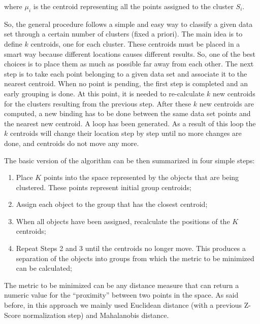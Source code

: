 \documentclass[12pt,a4paper,cucitura]{toptesi}
\begin{document}
where $\mu_i$ is the centroid representing all the points assigned to the cluster $S_i$.

So, the general procedure follows a simple and easy way to classify a given data set through a certain number of clusters (fixed a priori).
The main idea is to define $k$ centroids, one for each cluster.
These centroids must be placed in a smart way because different locations causes different results.
So, one of the best choices is to place them as much as possible far away from each other.
The next step is to take each point belonging to a given data set and associate it to the nearest centroid.
When no point is pending, the first step is completed and an early grouping is done.
At this point, it is needed to re-calculate $k$ new centroids for the clusters resulting from the previous step.
After these $k$ new centroids are computed, a new binding has to be done between the same data set points and the nearest new centroid.
A loop has been generated. As a result of this loop the $k$ centroids will change their location step by step until no more changes are done, and centroids do not move any more.

The basic version of the algorithm can be then summarized in four simple steps:

\begin{enumerate}
\item Place $K$ points into the space represented by the objects that are being clustered. These points represent initial group centroids;
\item Assign each object to the group that has the closest centroid;
\item When all objects have been assigned, recalculate the positions of the $K$ centroids;
\item Repeat Steps 2 and 3 until the centroids no longer move. This produces a separation of the objects into groups from which the metric to be minimized can be calculated;
\end{enumerate}

The metric to be minimized can be any distance measure that can return a numeric value for the ``proximity'' between two points in the space.
As said before, in this approach we mainly used Euclidean distance (with a previous Z-Score normalization step) and Mahalanobis distance.
\end{document}
